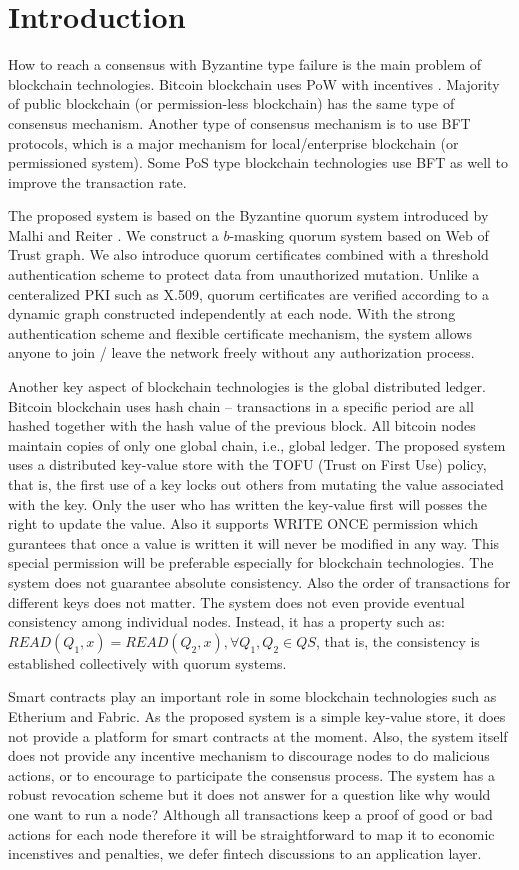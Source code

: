 \section{Introduction}
How to reach a consensus with Byzantine type failure is the main
problem of blockchain technologies. Bitcoin blockchain uses PoW with
incentives \cite{bitcoin}. Majority of public blockchain (or permission-less
blockchain) has the same type of consensus mechanism. Another type of
consensus mechanism is to use BFT protocols, which is a major
mechanism for local/enterprise blockchain (or permissioned
system). Some PoS type blockchain technologies use BFT as well to
improve the transaction rate.

The proposed system is based on the Byzantine quorum system introduced
by Malhi and Reiter \cite{Delhi:1}. We construct a $b$-masking quorum
system based on Web of Trust graph. We also introduce quorum certificates
combined with a threshold authentication scheme to protect data from
unauthorized mutation. Unlike a centeralized PKI such as X.509, quorum
certificates are verified according to a dynamic graph constructed
independently at each node. With the strong authentication scheme and
flexible certificate mechanism, the system allows anyone to join /
leave the network freely without any authorization process.

Another key aspect of blockchain technologies is the global
distributed ledger. Bitcoin blockchain uses hash chain -- transactions
in a specific period are all hashed together with the hash value of
the previous block. All bitcoin nodes maintain copies of only one
global chain, i.e., global ledger.
The proposed system uses a distributed key-value store with the TOFU
(Trust on First Use) policy, that is, the first use of a key locks out
others from mutating the value associated with the key. Only the
user who has written the key-value first will posses the right to
update the value. Also it supports WRITE ONCE permission which
gurantees that once a value is written it will never be modified in
any way. This special permission will be preferable especially for
blockchain technologies.
The system does not guarantee absolute consistency. Also the order of
transactions for different keys does not matter. The system does not
even provide eventual consistency among individual nodes. Instead, it
has a property such as: $READ(Q_1, x) = READ(Q_2, x), \forall Q_1, Q_2
\in QS$, that is, the consistency is established collectively with
quorum systems.

Smart contracts play an important role in some blockchain technologies
such as Etherium and Fabric. As the proposed system is a simple
key-value store, it does not provide a platform for smart contracts at
the moment. Also, the system itself does not provide any incentive
mechanism to discourage nodes to do malicious actions, or to encourage
to participate the consensus process. The system has a robust
revocation scheme but it does not answer for a question like why would
one want to run a node? Although all transactions keep a proof of good
or bad actions for each node therefore it will be straightforward to
map it to economic incenstives and penalties, we defer fintech
discussions to an application layer.
